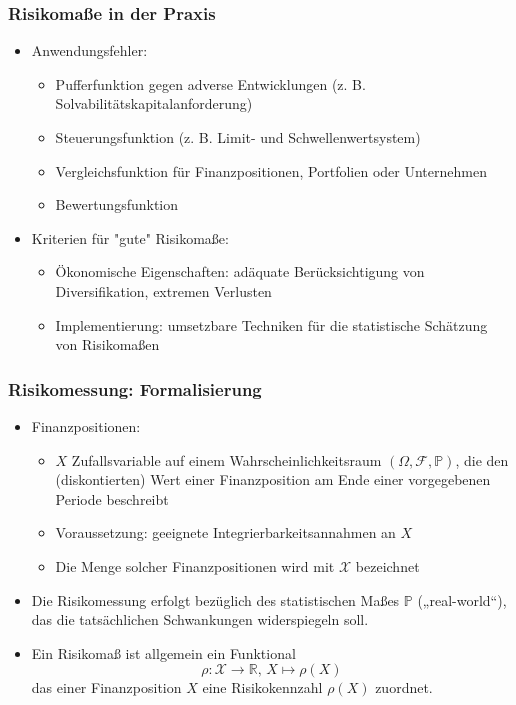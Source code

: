 \documentclass[12pt]{report}
\theoremstyle{dotless}
\theoremstyle{definition}
\begin{document}
\subsubsection{Risikomaße in der Praxis}
\begin{itemize}
\item Anwendungsfehler: 
\begin{itemize}
\item Pufferfunktion gegen adverse Entwicklungen (z. B. Solvabilitätskapitalanforderung)
\item Steuerungsfunktion (z. B. Limit- und Schwellenwertsystem)
\item Vergleichsfunktion für Finanzpositionen, Portfolien oder Unternehmen
\item Bewertungsfunktion
\end{itemize}
\item Kriterien für "gute" Risikomaße:
\begin{itemize}
\item Ökonomische Eigenschaften: adäquate Berücksichtigung von Diversifikation,
extremen Verlusten
\item Implementierung: umsetzbare Techniken für die statistische Schätzung von
Risikomaßen
\end{itemize}
\end{itemize}

\subsubsection{Risikomessung: Formalisierung}
\begin{itemize}
\item Finanzpositionen:
\begin{itemize}
\item $X$ Zufallsvariable auf einem Wahrscheinlichkeitsraum $(\Omega, \mathcal{F}, \mathbb{P})$, die den
(diskontierten) Wert einer Finanzposition am Ende einer vorgegebenen Periode
beschreibt
\item Voraussetzung: geeignete Integrierbarkeitsannahmen an $X$ 
\item Die Menge solcher Finanzpositionen wird mit $\mathcal{X}$ bezeichnet
\end{itemize}
\item Die Risikomessung erfolgt bezüglich des statistischen Maßes $\mathbb{P}$ („real-world“),
das die tatsächlichen Schwankungen widerspiegeln soll.
\item Ein Risikomaß ist allgemein ein Funktional 
\begin{equation}
\rho: \mathcal{X} \rightarrow \mathbb{R} \text{, } X \mapsto \rho(X)
\end{equation}
das einer Finanzposition $X$ eine Risikokennzahl $\rho(X)$ zuordnet.
\end{itemize}
\end{document}
